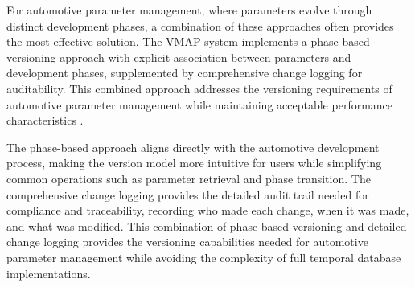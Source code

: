 
For automotive parameter management, where parameters evolve through distinct development phases, a combination of these approaches often provides the most effective solution. The VMAP system implements a phase-based versioning approach with explicit association between parameters and development phases, supplemented by comprehensive change logging for auditability. This combined approach addresses the versioning requirements of automotive parameter management while maintaining acceptable performance characteristics \cite{broy2006challenges}.

The phase-based approach aligns directly with the automotive development process, making the version model more intuitive for users while simplifying common operations such as parameter retrieval and phase transition. The comprehensive change logging provides the detailed audit trail needed for compliance and traceability, recording who made each change, when it was made, and what was modified. This combination of phase-based versioning and detailed change logging provides the versioning capabilities needed for automotive parameter management while avoiding the complexity of full temporal database implementations.
